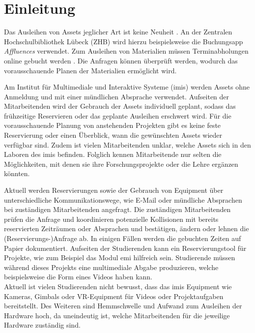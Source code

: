 
\chapter{Einleitung}
Das Ausleihen von Assets jeglicher Art ist keine Neuheit
\cite{soderholm2018borrowing}. An der Zentralen Hochschulbibliothek Lübeck (ZHB)
wird hierzu beispielsweise die Buchungsapp
\textit{Affluences} \cite{affluences2022} verwendet.
Zum Ausleihen von Materialien müssen Terminabholungen online gebucht werden
\cite{zhb_offnung_nodate}. Die Anfragen können überprüft werden, wodurch das
vorausschauende Planen der Materialien ermöglicht wird.

Am Institut für Multimediale und Interaktive Systeme (\ac{imis}) werden Assets
ohne Anmeldung und mit einer mündlichen Absprache verwendet. Aufseiten der
Mitarbeitenden wird der Gebrauch der Assets individuell geplant, sodass das
frühzeitige Reservieren oder das geplante Ausleihen erschwert wird. Für die
vorausschauende Planung von anstehenden Projekten gibt es keine feste
Reservierung oder einen Überblick, wann die gewünschten Assets wieder verfügbar
sind. Zudem ist vielen Mitarbeitenden unklar, welche Assets sich in den Laboren
des \ac{imis} befinden. Folglich kennen Mitarbeitende nur selten die
Möglichkeiten, mit denen sie ihre Forschungsprojekte oder die Lehre ergänzen
könnten.

Aktuell werden Reservierungen sowie der Gebrauch von Equipment über
unterschiedliche Kommunikationswege, wie E-Mail oder mündliche Absprachen bei
zuständigen Mitarbeitenden angefragt. Die zuständigen Mitarbeitenden prüfen die
Anfrage und koordinieren potenzielle Kollisionen mit bereits reservierten
Zeiträumen oder Absprachen und bestätigen, ändern oder lehnen die
(Reservierungs-)Anfrage ab. In einigen Fällen werden die gebuchten Zeiten auf
Papier dokumentiert. Aufseiten der Studierenden kann ein Reservierungstool für
Projekte, wie zum Beispiel das Modul \ac{emi} hilfreich sein. Studierende
müssen während dieses Projekts eine multimediale Abgabe produzieren, welche
beispielsweise die Form eines Videos haben kann.\\ Aktuell ist vielen
Studierenden nicht bewusst, dass das \ac{imis} Equipment wie Kameras, Gimbals
oder VR-Equipment für Videos oder Projektaufgaben bereitstellt. Des Weiteren
sind Hemmschwelle und Aufwand zum Ausleihen der Hardware hoch, da uneindeutig
ist, welche Mitarbeitenden für die jeweilige Hardware zuständig sind.

